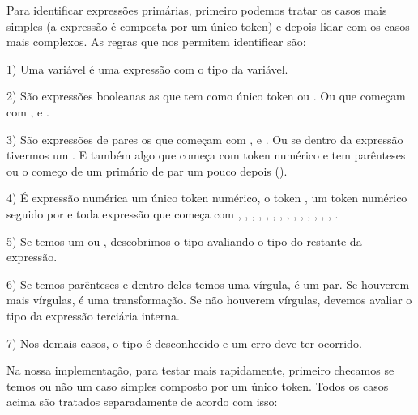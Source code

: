 {{{{{{Para identificar expressões primárias, primeiro podemos tratar os
casos mais simples (a expressão é composta por um único token) e
depois lidar com os casos mais complexos. As regras que nos permitem
identificar são:

1) Uma variável é uma expressão com o tipo da variável.

2) São expressões booleanas as que tem como único
token  ou . Ou que começam
com ,  e
.

3) São expressões de pares os que começam
com , 
e . Ou se dentro da expressão tivermos
um \monoespaco{[}. E também algo que começa com token numérico e tem
parênteses ou o começo de um primário de par um pouco depois
().

4) É expressão numérica um único token numérico, o
token , um token numérico seguido
por \monoespaco{/} e toda expressão que começa
com , , , ,
, , , ,
, , , ,
, , .

5) Se temos um \monoespaco{+} ou \monoespaco{-}, descobrimos o tipo
avaliando o tipo do restante da expressão.

6) Se temos parênteses e dentro deles temos uma vírgula, é um par. Se
houverem mais vírgulas, é uma transformação. Se não houverem vírgulas,
devemos avaliar o tipo da expressão terciária interna.

7) Nos demais casos, o tipo é desconhecido e um erro deve ter ocorrido.

Na nossa implementação, para testar mais rapidamente, primeiro
checamos se temos ou não um caso simples composto por um único
token. Todos os casos acima são tratados separadamente de acordo com
isso:

}}}}}}
